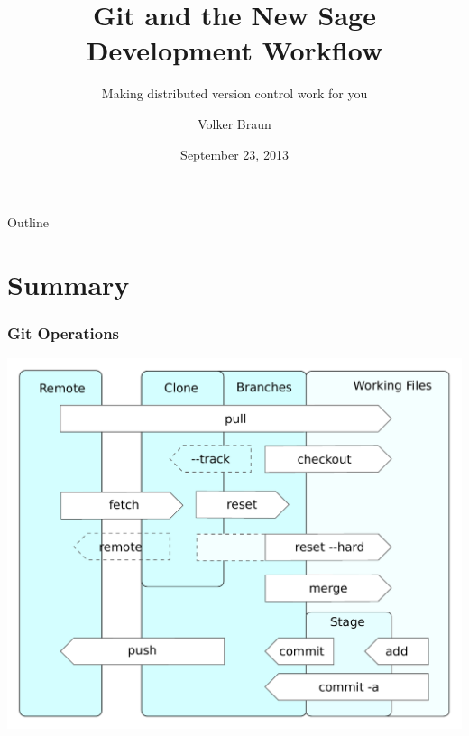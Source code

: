 \documentclass[t,11pt]{beamer}
\author{Volker Braun}
\title{Git and the New Sage Development Workflow}
\subtitle{Making distributed version control work for you}
\institute{Oxford University}
\date{September 23, 2013}
\begin{document}
\begin{frame}[plain]
	\titlepage
\end{frame}

\begin{frame}{Outline}
	\tableofcontents
\end{frame}








\section{Summary}

\begin{frame}[plain]
  \frametitle{Git Operations}
  \centering
  \includegraphics[width=0.85\linewidth]{images/git_operations}
\end{frame}
\end{document}
